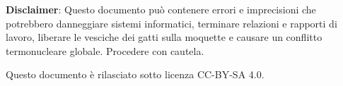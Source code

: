 \documentclass[a4paper]{article}
\begin{document}
% 
% 
% 
% 
% 
% 
% 
% 
% 
% 
% 
% 
\textbf{Disclaimer}:  Questo documento può contenere errori e imprecisioni che potrebbero danneggiare sistemi informatici, terminare relazioni e rapporti di lavoro, liberare le vesciche dei gatti sulla moquette e causare un conflitto termonucleare globale.
Procedere con cautela.

Questo documento è rilasciato sotto licenza CC-BY-SA 4.0. \ccbysa
\end{document}

